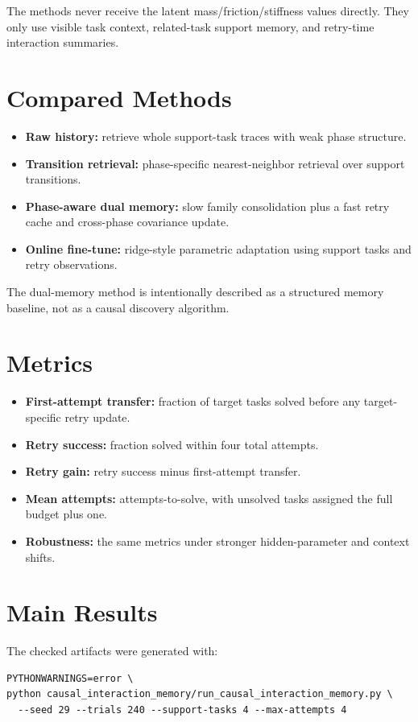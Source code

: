 \documentclass[11pt]{article}
\begin{document}
The methods never receive the latent mass/friction/stiffness values directly. They only use visible task context, related-task support memory, and retry-time interaction summaries.

\section{Compared Methods}
\begin{itemize}[leftmargin=1.5em]
  \item \textbf{Raw history:} retrieve whole support-task traces with weak phase structure.
  \item \textbf{Transition retrieval:} phase-specific nearest-neighbor retrieval over support transitions.
  \item \textbf{Phase-aware dual memory:} slow family consolidation plus a fast retry cache and cross-phase covariance update.
  \item \textbf{Online fine-tune:} ridge-style parametric adaptation using support tasks and retry observations.
\end{itemize}
The dual-memory method is intentionally described as a structured memory baseline, not as a causal discovery algorithm.

\section{Metrics}
\begin{itemize}[leftmargin=1.5em]
  \item \textbf{First-attempt transfer:} fraction of target tasks solved before any target-specific retry update.
  \item \textbf{Retry success:} fraction solved within four total attempts.
  \item \textbf{Retry gain:} retry success minus first-attempt transfer.
  \item \textbf{Mean attempts:} attempts-to-solve, with unsolved tasks assigned the full budget plus one.
  \item \textbf{Robustness:} the same metrics under stronger hidden-parameter and context shifts.
\end{itemize}

\section{Main Results}
The checked artifacts were generated with:
\begin{verbatim}
PYTHONWARNINGS=error \
python causal_interaction_memory/run_causal_interaction_memory.py \
  --seed 29 --trials 240 --support-tasks 4 --max-attempts 4
\end{verbatim}
\end{document}
